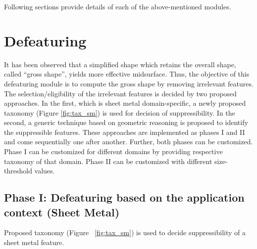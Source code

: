 Following sections provide details of each of the above-mentioned modules.

\section{Defeaturing}
It has been observed that a simplified shape which retains the overall shape, called ``gross shape'', yields more effective midsurface. Thus, the objective of this defeaturing module is to compute the gross shape by removing irrelevant features. The selection/eligibility of the irrelevant features is decided by two proposed approaches. In the first, which is sheet metal domain-specific, a newly proposed taxonomy (Figure \ref{fig:tax_sm}) is used for decision of suppressibility. In the second, a generic technique based on geometric reasoning is proposed to identify the suppressible features. These approaches are implemented as phases I and II and come sequentially one after another. Further, both phases can be customized. Phase I can be customized for different domains by providing respective taxonomy of that domain. Phase II can be customized with different size-threshold values.

\subsection{Phase I: Defeaturing based on the application context (Sheet Metal)}\label{ph1}
Proposed  taxonomy (Figure ~\ref{fig:tax_sm}) is used to decide suppressibility of a sheet metal feature.


